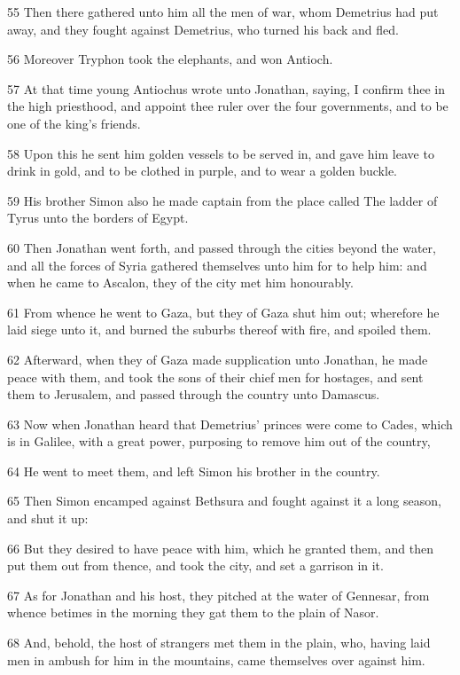 \par 55 Then there gathered unto him all the men of war, whom Demetrius had put away, and they fought against Demetrius, who turned his back and fled.
\par 56 Moreover Tryphon took the elephants, and won Antioch.
\par 57 At that time young Antiochus wrote unto Jonathan, saying, I confirm thee in the high priesthood, and appoint thee ruler over the four governments, and to be one of the king's friends.
\par 58 Upon this he sent him golden vessels to be served in, and gave him leave to drink in gold, and to be clothed in purple, and to wear a golden buckle.
\par 59 His brother Simon also he made captain from the place called The ladder of Tyrus unto the borders of Egypt.
\par 60 Then Jonathan went forth, and passed through the cities beyond the water, and all the forces of Syria gathered themselves unto him for to help him: and when he came to Ascalon, they of the city met him honourably.
\par 61 From whence he went to Gaza, but they of Gaza shut him out; wherefore he laid siege unto it, and burned the suburbs thereof with fire, and spoiled them.
\par 62 Afterward, when they of Gaza made supplication unto Jonathan, he made peace with them, and took the sons of their chief men for hostages, and sent them to Jerusalem, and passed through the country unto Damascus.
\par 63 Now when Jonathan heard that Demetrius' princes were come to Cades, which is in Galilee, with a great power, purposing to remove him out of the country,
\par 64 He went to meet them, and left Simon his brother in the country.
\par 65 Then Simon encamped against Bethsura and fought against it a long season, and shut it up:
\par 66 But they desired to have peace with him, which he granted them, and then put them out from thence, and took the city, and set a garrison in it.
\par 67 As for Jonathan and his host, they pitched at the water of Gennesar, from whence betimes in the morning they gat them to the plain of Nasor.
\par 68 And, behold, the host of strangers met them in the plain, who, having laid men in ambush for him in the mountains, came themselves over against him.
